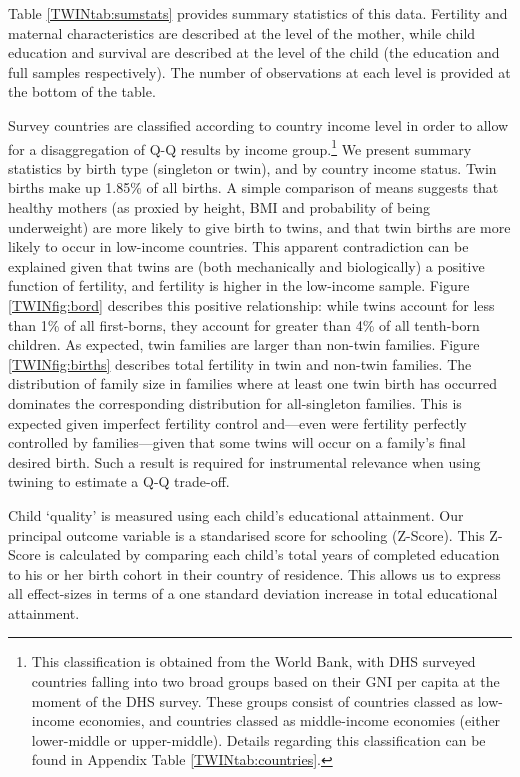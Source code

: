 Table \ref{TWINtab:sumstats} provides summary statistics of this data. Fertility 
and maternal characteristics are described at the level of the mother, while 
child education and survival are described at the level of the child (the 
education and full samples respectively).  The number of observations at each 
level is provided at the bottom of the table.

Survey countries are classified according to country income level in order to 
allow for a disaggregation of Q-Q results by income group.\footnote{This 
classification is obtained from the World Bank, with DHS surveyed countries 
falling into two broad groups based on their GNI per capita at the moment of the 
DHS survey.  These groups consist of countries classed as low-income economies, 
and countries classed as middle-income economies (either lower-middle or 
upper-middle). Details regarding this classification can be found in Appendix 
Table \ref{TWINtab:countries}.}  We present summary statistics by birth type
(singleton or twin), and by country income status.  Twin births make up 1.85\% 
of all births.  A simple comparison of means suggests that healthy mothers (as 
proxied by height, BMI and probability of being underweight) are more likely to 
give birth to twins, and that twin births are more likely to occur in low-income
countries.  This apparent contradiction can be explained given that twins are
(both mechanically and biologically) a positive function of fertility, and 
fertility is higher in the low-income sample.  Figure \ref{TWINfig:bord} 
describes this positive relationship: while twins account for less than 1\% of 
all first-borns, they account for greater than 4\% of all tenth-born children.
As expected, twin families are larger than non-twin families. Figure 
\ref{TWINfig:births} describes total fertility in twin and non-twin families.  
The distribution of family size in families where at least one twin birth has 
occurred dominates the corresponding distribution for all-singleton families.  
This is expected given imperfect fertility control and---even were fertility 
perfectly controlled by families---given that some twins will occur on a family's 
final desired birth.  Such a result is required for instrumental relevance when
using twining to estimate a Q-Q trade-off.

Child `quality' is measured using each child's educational attainment.  Our
principal outcome variable is a standarised score for schooling (Z-Score). This
Z-Score is calculated by comparing each child's total years of completed 
education to his or her birth cohort in their country of residence.  This allows
us to express all effect-sizes in terms of a one standard deviation increase 
in total educational attainment.

